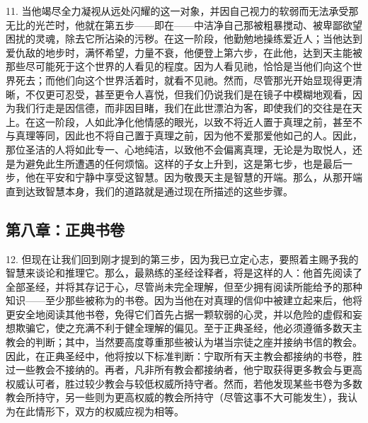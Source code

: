11. 当他竭尽全力凝视从远处闪耀的这一对象，并因自己视力的软弱而无法承受那无比的光芒时，他就在第五步——即在——中洁净自己那被粗暴搅动、被卑鄙欲望困扰的灵魂，除去它所沾染的污秽。在这一阶段，他勤勉地操练爱近人；当他达到爱仇敌的地步时，满怀希望，力量不衰，他便登上第六步，在此他，达到天主能被那些尽可能死于这个世界的人看见的程度。因为人看见祂，恰恰是当他们向这个世界死去；而他们向这个世界活着时，就看不见祂。然而，尽管那光开始显现得更清晰，不仅更可忍受，甚至更令人喜悦，但我们仍说我们是在镜子中模糊地观看，因为我们行走是因信德，而非因目睹，我们在此世漂泊为客，即使我们的交往是在天上。在这一阶段，人如此净化他情感的眼光，以致不将近人置于真理之前，甚至不与真理等同，因此也不将自己置于真理之前，因为他不爱那爱他如己的人。因此，那位圣洁的人将如此专一、心地纯洁，以致他不会偏离真理，无论是为取悦人，还是为避免此生所遭遇的任何烦恼。这样的子女上升到，这是第七步，也是最后一步，他在平安和宁静中享受这智慧。因为敬畏天主是智慧的开端。那么，从那开端直到达致智慧本身，我们的道路就是通过现在所描述的这些步骤。\par


\subsection{第八章：正典书卷}

12. 但现在让我们回到刚才提到的第三步，因为我已立定心志，要照着主赐予我的智慧来谈论和推理它。那么，最熟练的圣经诠释者，将是这样的人：他首先阅读了全部圣经，并将其存记于心，尽管尚未完全理解，但至少拥有阅读所能给予的那种知识——至少那些被称为的书卷。因为当他在对真理的信仰中被建立起来后，他将更安全地阅读其他书卷，免得它们首先占据一颗软弱的心灵，并以危险的虚假和妄想欺骗它，使之充满不利于健全理解的偏见。至于正典圣经，他必须遵循多数天主教会的判断；其中，当然要高度尊重那些被认为堪当宗徒之座并接纳书信的教会。因此，在正典圣经中，他将按以下标准判断：宁取所有天主教会都接纳的书卷，胜过一些教会不接纳的。再者，凡非所有教会都接纳者，他宁取获得更多教会与更高权威认可者，胜过较少教会与较低权威所持守者。然而，若他发现某些书卷为多数教会所持守，另一些则为更高权威的教会所持守（尽管这事不大可能发生），我认为在此情形下，双方的权威应视为相等。\par


